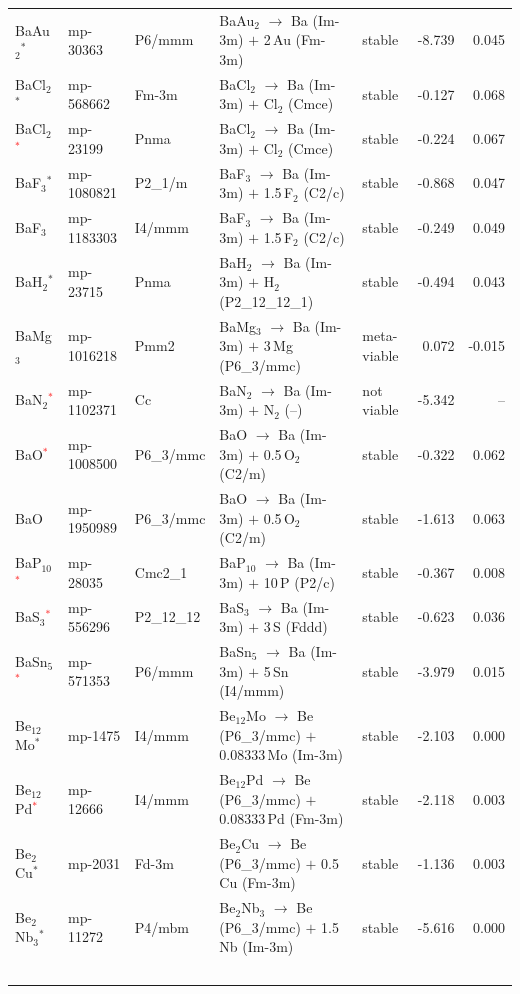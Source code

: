 \begin{longtable}{@{}ll l@{\hspace{4pt}} p{4.6cm} l@{\hspace{4pt}} rr@{}}
BaAu$_{2}$$^*$ & mp-30363 & P6/mmm & BaAu$_{2}$ $\to$ Ba (Im-3m) $+$ 2\,Au (Fm-3m) & stable & -8.739 & 0.045 \\
BaCl$_{2}$$^*$ & mp-568662 & Fm-3m & BaCl$_{2}$ $\to$ Ba (Im-3m) $+$ Cl$_{2}$ (Cmce) & stable & -0.127 & 0.068 \\
BaCl$_{2}$\textcolor{red}{$^*$} & mp-23199 & Pnma & BaCl$_{2}$ $\to$ Ba (Im-3m) $+$ Cl$_{2}$ (Cmce) & stable & -0.224 & 0.067 \\
BaF$_{3}$$^*$ & mp-1080821 & P2\_1/m & BaF$_{3}$ $\to$ Ba (Im-3m) $+$ 1.5\,F$_{2}$ (C2/c) & stable & -0.868 & 0.047 \\
BaF$_{3}$ & mp-1183303 & I4/mmm & BaF$_{3}$ $\to$ Ba (Im-3m) $+$ 1.5\,F$_{2}$ (C2/c) & stable & -0.249 & 0.049 \\
BaH$_{2}$$^*$ & mp-23715 & Pnma & BaH$_{2}$ $\to$ Ba (Im-3m) $+$ H$_{2}$ (P2\_12\_12\_1) & stable & -0.494 & 0.043 \\
BaMg$_{3}$ & mp-1016218 & Pmm2 & BaMg$_{3}$ $\to$ Ba (Im-3m) $+$ 3\,Mg (P6\_3/mmc) & meta-viable & 0.072 & -0.015 \\
BaN$_{2}$\textcolor{red}{$^*$} & mp-1102371 & Cc & BaN$_{2}$ $\to$ Ba (Im-3m) $+$ N$_{2}$ (--) & not viable & -5.342 & -- \\
BaO\textcolor{red}{$^*$} & mp-1008500 & P6\_3/mmc & BaO $\to$ Ba (Im-3m) $+$ 0.5\,O$_{2}$ (C2/m) & stable & -0.322 & 0.062 \\
BaO & mp-1950989 & P6\_3/mmc & BaO $\to$ Ba (Im-3m) $+$ 0.5\,O$_{2}$ (C2/m) & stable & -1.613 & 0.063 \\
BaP$_{10}$\textcolor{red}{$^*$} & mp-28035 & Cmc2\_1 & BaP$_{10}$ $\to$ Ba (Im-3m) $+$ 10\,P (P2/c) & stable & -0.367 & 0.008 \\
BaS$_{3}$\textcolor{red}{$^*$} & mp-556296 & P2\_12\_12 & BaS$_{3}$ $\to$ Ba (Im-3m) $+$ 3\,S (Fddd) & stable & -0.623 & 0.036 \\
BaSn$_{5}$\textcolor{red}{$^*$} & mp-571353 & P6/mmm & BaSn$_{5}$ $\to$ Ba (Im-3m) $+$ 5\,Sn (I4/mmm) & stable & -3.979 & 0.015 \\
Be$_{12}$Mo$^*$ & mp-1475 & I4/mmm & Be$_{12}$Mo $\to$ Be (P6\_3/mmc) $+$ 0.08333\,Mo (Im-3m) & stable & -2.103 & 0.000 \\
Be$_{12}$Pd\textcolor{red}{$^*$} & mp-12666 & I4/mmm & Be$_{12}$Pd $\to$ Be (P6\_3/mmc) $+$ 0.08333\,Pd (Fm-3m) & stable & -2.118 & 0.003 \\
Be$_{2}$Cu$^*$ & mp-2031 & Fd-3m & Be$_{2}$Cu $\to$ Be (P6\_3/mmc) $+$ 0.5\,Cu (Fm-3m) & stable & -1.136 & 0.003 \\
Be$_{2}$Nb$_{3}$$^*$ & mp-11272 & P4/mbm & Be$_{2}$Nb$_{3}$ $\to$ Be (P6\_3/mmc) $+$ 1.5\,Nb (Im-3m) & stable & -5.616 & 0.000 \\
$$
\end{longtable}
